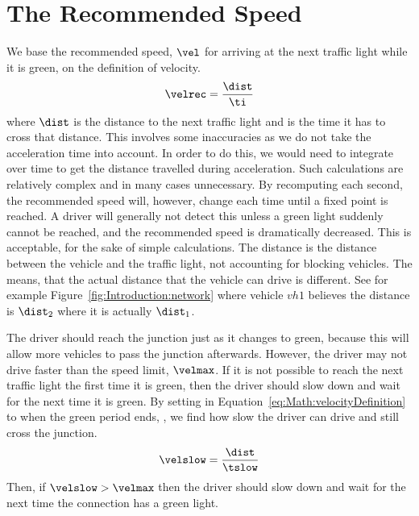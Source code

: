 \section{The Recommended Speed}\label{sec:Math}

We base the recommended speed, $\vel$ for arriving at the next traffic light while it is green, on the definition of velocity.
\begin{eqnarray}
\velrec = \frac{\dist}{\ti}\label{eq:Math:velocityDefinition}
\end{eqnarray}
where $\dist$ is the distance to the next traffic light and \ti is the time it has to cross that distance.
This involves some inaccuracies as we do not take the acceleration time into account. %
In order to do this, we would need to integrate over time to get the distance travelled during acceleration.
Such calculations are relatively complex and in many cases unnecessary. 
By recomputing each second, the recommended speed will, however, change each time until a fixed point is reached. 
A driver will generally not detect this unless a green light suddenly cannot be reached, and the recommended speed is dramatically decreased.
This is acceptable, for the sake of simple calculations.
The distance \dist is the distance between the vehicle and the traffic light, not accounting for blocking vehicles.
The means, that the actual distance that the vehicle can drive is different.
See for example Figure~\ref{fig:Introduction:network} where vehicle $vh1$ believes the distance is $\dist_2$ where it is actually $\dist_1$.


The driver should reach the junction just as it changes to green, because this will allow more vehicles to pass the junction afterwards.
However, the driver may not drive faster than the speed limit, $\velmax$.
If it is not possible to reach the next traffic light the first time it is green, then the driver should slow down and wait for the next time it is green.
By setting \ti in Equation~\ref{eq:Math:velocityDefinition} to when the green period ends, \tslow, we find how slow the driver can drive and still cross the junction.
\begin{eqnarray}
\velslow = \frac{\dist}{\tslow}\label{eq:Math:velocitySlow}
\end{eqnarray}
Then, if $\velslow > \velmax$ then the driver should slow down and wait for the next time the connection has a green light.


